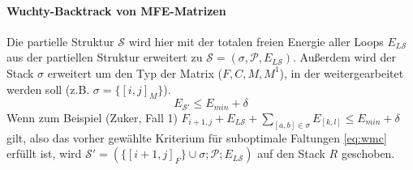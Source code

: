 \paragraph{Wuchty-Backtrack von MFE-Matrizen}
Die partielle Struktur $\mathcal{S}$ wird hier mit der totalen 
freien Energie aller Loops $E_{L\mathcal{S}}$ aus der partiellen Struktur erweitert 
zu $\mathcal{S}=(\sigma,\mathcal{P}, E_{L\mathcal{S}})$.
Außerdem wird der Stack $\sigma$ erweitert um den Typ der Matrix ($F, C, M, M^1$), 
in der weitergearbeitet werden soll (z.B. $\sigma = \{[i,j]_{M}\}$). 
\begin{equation} \label{eq:wmc}
	E_{\mathcal{S}'} \leqslant E_{min} + \delta
\end{equation}
Wenn zum Beispiel (Zuker, Fall 1)
$F_{i+1,j} + E_{L\mathcal{S}} + \sum_{[a,b] \in \sigma} E_{[k,l]} \leqslant E_{min} + \delta$ 
gilt, also das vorher gew\"ahlte Kriterium f\"ur suboptimale Faltungen \eqref{eq:wmc} 
erf\"ullt ist, 
wird $\mathcal{S}' = (\{[i+1,j]_F\} \cup \sigma; \mathcal{P}; E_{L\mathcal{S}})$ auf den 
Stack $R$ geschoben.

